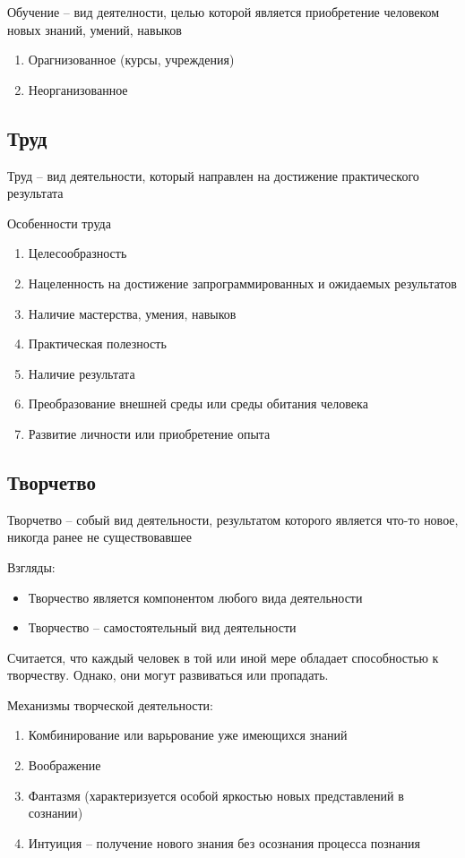 \documentclass[12pt,a4paper]{book}
\begin{document}
Обучение -- вид деятелности, целью которой является приобретение человеком новых знаний, умений, навыков

\begin{enumerate}
	\item Орагнизованное (курсы, учреждения)
	\item Неорганизованное 
\end{enumerate}
\subsection{Труд}

Труд -- вид деятельности, который направлен на достижение практического результата

Особенности труда
\begin{enumerate}
	\item Целесообразность
	\item Нацеленность на достижение запрограммированных и ожидаемых результатов
	\item Наличие мастерства, умения, навыков
	\item Практическая полезность
	\item Наличие результата
	\item Преобразование внешней среды или среды обитания человека
	\item Развитие личности или приобретение опыта
\end{enumerate}

\subsection{Творчетво}
Творчетво -- собый вид деятельности, результатом которого является что-то новое, никогда ранее не существовавшее

Взгляды:
\begin{itemize}
	\item Творчество является компонентом любого вида деятельности 
	\item Творчество -- самостоятельный вид деятельности
\end{itemize}

Считается, что каждый человек в той или иной мере обладает способностью к творчеству. Однако, они могут развиваться или пропадать.

Механизмы творческой деятельности:
\begin{enumerate}
	\item Комбинирование или варьрование уже имеющихся знаний
	\item Воображение
	\item Фантазмя (характеризуется особой яркостью новых представлений в сознании)
	\item Интуиция -- получение нового знания без осознания процесса познания
\end{enumerate}
\end{document}
